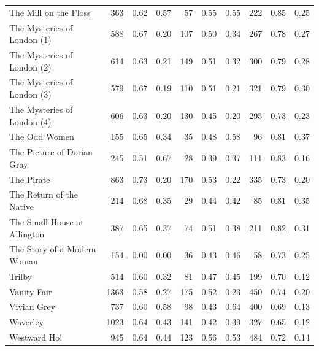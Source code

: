 \begin{longtable}{l|rrr|rrr|rrr}
The Mill on the Floss & 363 & 0.62 & 0.57 & 57 & 0.55 & 0.55 & 222 & 0.85 & 0.25 \\
The Mysteries of London (1) & 588 & 0.67 & 0.20 & 107 & 0.50 & 0.34 & 267 & 0.78 & 0.27 \\
The Mysteries of London (2) & 614 & 0.63 & 0.21 & 149 & 0.51 & 0.32 & 300 & 0.79 & 0.28 \\
The Mysteries of London (3) & 579 & 0.67 & 0.19 & 110 & 0.51 & 0.21 & 321 & 0.79 & 0.30 \\
The Mysteries of London (4) & 606 & 0.63 & 0.20 & 130 & 0.45 & 0.20 & 295 & 0.73 & 0.23 \\
The Odd Women & 155 & 0.65 & 0.34 & 35 & 0.48 & 0.58 & 96 & 0.81 & 0.37 \\
The Picture of Dorian Gray & 245 & 0.51 & 0.67 & 28 & 0.39 & 0.37 & 111 & 0.83 & 0.16 \\
The Pirate & 863 & 0.73 & 0.20 & 170 & 0.53 & 0.22 & 335 & 0.73 & 0.20 \\
The Return of the Native & 214 & 0.68 & 0.35 & 29 & 0.44 & 0.42 & 85 & 0.81 & 0.35 \\
The Small House at Allington & 387 & 0.65 & 0.37 & 74 & 0.51 & 0.38 & 211 & 0.82 & 0.31 \\
The Story of a Modern Woman & 154 & 0.00 & 0.00 & 36 & 0.43 & 0.46 & 58 & 0.73 & 0.25 \\
Trilby & 514 & 0.60 & 0.32 & 81 & 0.47 & 0.45 & 199 & 0.70 & 0.12 \\
Vanity Fair & 1363 & 0.58 & 0.27 & 175 & 0.52 & 0.23 & 450 & 0.74 & 0.20 \\
Vivian Grey & 737 & 0.60 & 0.58 & 98 & 0.43 & 0.64 & 400 & 0.69 & 0.13 \\
Waverley & 1023 & 0.64 & 0.43 & 141 & 0.42 & 0.39 & 327 & 0.65 & 0.12 \\
Westward Ho! & 945 & 0.64 & 0.44 & 123 & 0.56 & 0.53 & 484 & 0.72 & 0.14 \\
\end{longtable}

